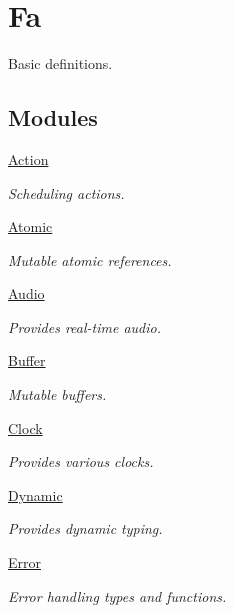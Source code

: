 \hypertarget{group___fa}{\section{Fa}
\label{group___fa}
}


Basic definitions.  


\subsection*{Modules}
\begin{DoxyCompactItemize}
\item 
\hyperlink{group___fa_action}{Action}
\begin{DoxyCompactList}\small\item\em Scheduling actions. \end{DoxyCompactList}\item 
\hyperlink{group___fa_atomic}{Atomic}
\begin{DoxyCompactList}\small\item\em Mutable atomic references. \end{DoxyCompactList}\item 
\hyperlink{group___fa_audio}{Audio}
\begin{DoxyCompactList}\small\item\em Provides real-\/time audio. \end{DoxyCompactList}\item 
\hyperlink{group___fa_buffer}{Buffer}
\begin{DoxyCompactList}\small\item\em Mutable buffers. \end{DoxyCompactList}\item 
\hyperlink{group___fa_clock}{Clock}
\begin{DoxyCompactList}\small\item\em Provides various clocks. \end{DoxyCompactList}\item 
\hyperlink{group___fa_dynamic}{Dynamic}
\begin{DoxyCompactList}\small\item\em Provides dynamic typing. \end{DoxyCompactList}\item 
\hyperlink{group___fa_error}{Error}
\begin{DoxyCompactList}\small\item\em Error handling types and functions. \end{DoxyCompactList}\item 

\end{DoxyCompactItemize}
